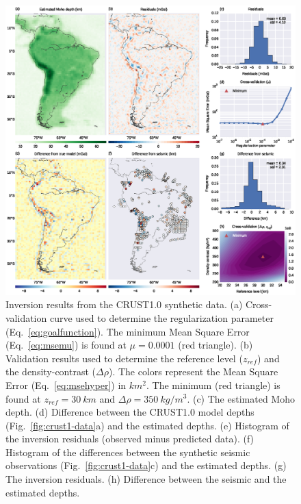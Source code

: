 \documentclass[extra,mreferee]{gji}
\begin{document}
\begin{figure}
    \centering
    \includegraphics[width=\textwidth]{figures/synthetic-crust1-results}
    \caption{
        Inversion results from the CRUST1.0 synthetic data.
        (a) Cross-validation curve used to determine
        the regularization parameter (Eq.~\ref{eq:goalfunction}).
        The minimum Mean Square Error (Eq.~\ref{eq:msemu}) is found at
        $\mu = 0.0001$ (red triangle).
        (b) Validation results used to determine
        the reference level ($z_{ref}$) and the density-contrast ($\Delta\rho$).
        The colors represent the Mean Square Error (Eq.~\ref{eq:msehyper}) in
        $km^2$.
        The minimum (red triangle) is found at $z_{ref} = 30\ km$
        and $\Delta\rho = 350\ kg/m^3$.
        (c) The estimated Moho depth.
        (d) Difference between the CRUST1.0 model depths
        (Fig.~\ref{fig:crust1-data}a)
        and the estimated depths.
        (e) Histogram of the inversion residuals
        (observed minus predicted data).
        (f) Histogram of the differences between
        the synthetic seismic observations (Fig.~\ref{fig:crust1-data}c)
        and the estimated depths.
        (g) The inversion residuals.
        (h) Difference between the seismic and the estimated depths.
    }
    \label{fig:crust1-results}
\end{figure}
\end{document}
